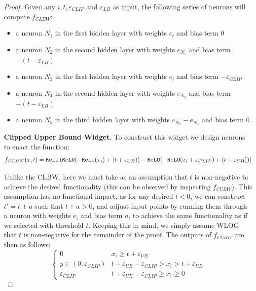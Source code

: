 \begin{proof}
Given any $i, t, \varepsilon_{CLIP}$ and $\varepsilon_{LB}$ as input, the following series of neurons will compute $f_{CLBW}$: 
\begin{itemize}
    \item a neuron $N_1$ in the first hidden layer with weights $e_i$ and bias term 0
    \item a neuron $N_2$ in the second hidden layer with weights $e_{N_1}$ and bias term $-(t-\varepsilon_{LB})$
    \item a neuron $N_3$ in the first hidden layer with weights $e_i$ and bias term $-\varepsilon_{CLIP}$
    \item a neuron $N_4$ in the second hidden layer with weights $e_{N_3}$ and bias term $-(t - \varepsilon_{LB})$
    \item a neuron $N_5$ in the third hidden layer with weights $e_{N_2} - e_{N_4}$ and bias term $0$.
\end{itemize}

\textbf{Clipped Upper Bound Widget.} To construct this widget we design neurons to enact the function:
\begin{align*}
    f_{CUBW}(x, t) = \texttt{ReLU} \left( \texttt{ReLU}(-\texttt{ReLU}(x_i)+(t+\varepsilon_{UB})) - \texttt{ReLU}(-\texttt{ReLU}(x_i + \varepsilon_{CLIP}) + (t + \varepsilon_{UB})) \right)
\end{align*}


Unlike the CLBW, here we must take as an assumption that $t$ is non-negative to achieve the desired functionality (this can be observed by inspecting $f_{CUBW}$). This assumption has no functional impact, as for any desired $t<0$, we can construct $t'=t+a$ such that $t+a>0$, and adjust input points by running them through a neuron with weights $e_i$ and bias term $a$, to achieve the same functionality as if we selected with threshold $t$. Keeping this in mind, we simply assume WLOG that $t$ is non-negative for the remainder of the proof. The outputs of $f_{CUBW}$ are then as follows:
\[ \begin{cases} 
      0 & x_i \geq t + \varepsilon_{UB} \\
      y \in (0, \varepsilon_{CLIP}) & t+\varepsilon_{UB}-\varepsilon_{CLIP} >x_i >t+\varepsilon_{UB} \\
      \varepsilon_{CLIP} & t+\varepsilon_{UB}-\varepsilon_{CLIP} \geq x_i \geq 0 
   \end{cases}
\]


\end{proof}
